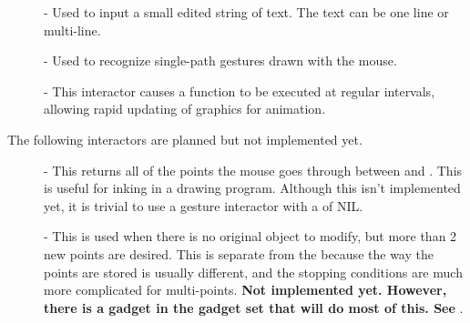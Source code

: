 \begin{description}
\item[]  
- Used to input a small edited string of text.  The
text can be one line or multi-line.

\item[]  
- Used to recognize single-path gestures drawn with the mouse.

\item[]  
- This interactor causes a function to be executed at regular intervals,
allowing rapid updating of graphics for animation.

\end{description}

\vspace{2 lines}
The following interactors are planned but not implemented yet.
\begin{description}
\item[]  
- This returns all of the points the mouse goes
through between  and .  This is useful for
inking in a drawing program.  Although this isn't implemented yet, it is
trivial to use a gesture interactor with a  of NIL.

\item[]  
- This is used when there is no original object to
modify, but more than 2 new points are desired.  This is separate from the
 because the way the points are stored is usually
different, and the stopping conditions are much more complicated for
multi-points.   {\bf Not implemented yet.  However, there is a gadget in the
gadget set that will do most of this.  See}
.

\end{description}


